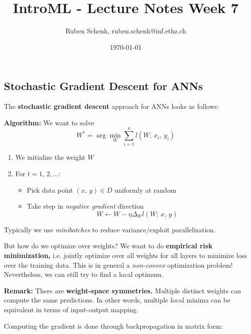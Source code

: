 \documentclass[a4paper]{extarticle}
\title{IntroML - Lecture Notes Week 7}
\author{Ruben Schenk, ruben.schenk@inf.ethz.ch}
\date{\today}
\begin{document}
\maketitle

\subsection{Stochastic Gradient Descent for ANNs}

The \textbf{stochastic gradient descent} approach for ANNs looks as follows:

\begin{cbox}
    \textbf{Algorithm:} We want to solve
    \[
        W^* = \arg \min_{W} \sum_{i = 1}^n l(W; \, x_i, \, y_i)
    \]
    \begin{enumerate}
        \item We initialize the weight $W$
        \item For $t = 1, \, 2,...$:
        \begin{itemize}
            \item Pick data point $(x, \, y) \in D$ uniformly at random
            \item Take step in \textit{negative gradient} direction
            \[
                W \leftarrow W - \eta \Delta_Wl(W; \, x, \, y)
            \]
        \end{itemize}
    \end{enumerate}
    Typically we use \textit{minibatches} to reduce variance/exploit parallelization.
\end{cbox}

But how do we optimize over weights? We want to do \textbf{empirical risk minimization,} i.e. jointly optimize over all weights for all layers to minimize loss over the training data. This is in general a \textit{non-convex} optimization problem! Nevertheless, we can still try to find a local optimum.

\textbf{Remark:} There are \textbf{weight-space symmetries.} Multiple distinct weights can compute the same predictions. In other words, multiple local minima can be equivalent in terms of input-output mapping.

Computing the gradient is done through backpropagation in matrix form:
\end{document}
